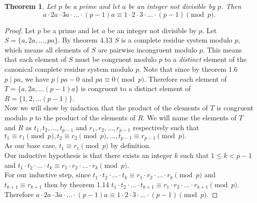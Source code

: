 \documentclass[12pt,leqno]{article}
\numberwithin{equation}{section}
\newtheorem{thm}{Theorem}[section]
\theoremstyle{definition}
\begin{document}
\begin{thm}
Let $p$ be a prime and let $a$ be an integer not divisible by $p$.
Then
\[a \cdot 2a \cdot 3a \cdot \hdots \cdot (p-1)a \equiv
    1 \cdot 2 \cdot 3 \cdot \hdots \cdot (p-1) \pmod{p}.\]
\end{thm}
\begin{proof}[Proof]
Let $p$ be a prime and let $a$ be an integer not divisible by $p$.  Let $S = \{a, 2a, \hdots, pa\}$.  By theorem 4.13 $S$ is a complete residue system modulo $p$, which means all elements of $S$ are pairwise incongruent modulo $p$.  This means that each element of $S$ must be congruent modulo $p$ to a \emph{distinct} element of the canonical complete residue system modulo $p$.  Note that since by theorem 1.6 $p \mid pa$, we have $p \mid pa - 0$ and $pa \equiv 0 \pmod{p}$.  Therefore each element of $T = \{a, 2a, \hdots (p-1)a\}$ is congruent to a distinct element of $R = \{1, 2, \hdots (p-1)\}$.\\

\newpage
Now we will show by induction that the product of the elements of $T$ is congruent modulo $p$ to the product of the elements of $R$.  We will name the elements of $T$ and $R$ as $t_1, t_2, \dots , t_{p-1}$ and $r_1, r_2, \dots , r_{p-1}$ respectively such that $t_1 \equiv r_1 \pmod{p}, t_2 \equiv r_2 \pmod{p}, \dots , t_{p-1} \equiv r_{p-1} \pmod{p}.$\\

As our base case, $t_1 \equiv r_1 \pmod{p}$ by definition.\\

Our inductive hypothesis is that there exists an integer $k$ such that $1 \leq k < p-1$  and $t_1 \cdot t_2 \cdot \hdots \cdot t_k \equiv r_1 \cdot r_2 \cdot \hdots \cdot r_k \pmod{p}$.\\

For our inductive step, since $t_1 \cdot t_2 \cdot \hdots \cdot t_k \equiv r_1 \cdot r_2 \cdot \hdots \cdot r_k \pmod{p}$ and $t_{k+1} \equiv r_{k+1}$ then by theorem 1.14  $t_1 \cdot t_2 \cdot \hdots \cdot t_{k+1} \equiv r_1 \cdot r_2 \cdot \hdots \cdot r_{k+1} \pmod{p}$.\\

Therefore $a \cdot 2a \cdot 3a \cdot \hdots \cdot (p-1)a \equiv 1 \cdot 2 \cdot 3 \cdot \hdots \cdot (p-1) \pmod{p}$.

\end{proof}

\end{document}
